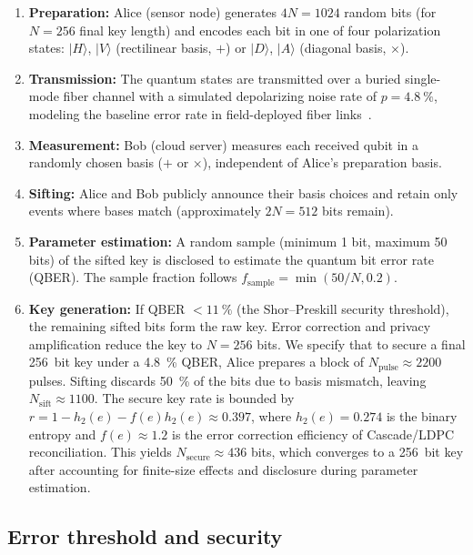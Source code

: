 \documentclass[11pt,a4paper]{article}
\begin{document}
\begin{enumerate}
\item \textbf{Preparation:} Alice (sensor node) generates $4N = 1024$ random bits (for $N = 256$ final key length) and encodes each bit in one of four polarization states: $|H\rangle$, $|V\rangle$ (rectilinear basis, $+$) or $|D\rangle$, $|A\rangle$ (diagonal basis, $\times$).
\item \textbf{Transmission:} The quantum states are transmitted over a buried single-mode fiber channel with a simulated depolarizing noise rate of $p = \qty{4.8}{\percent}$, modeling the baseline error rate in field-deployed fiber links~\cite{Zahidy2024}.
\item \textbf{Measurement:} Bob (cloud server) measures each received qubit in a randomly chosen basis ($+$ or $\times$), independent of Alice's preparation basis.
\item \textbf{Sifting:} Alice and Bob publicly announce their basis choices and retain only events where bases match (approximately $2N = 512$ bits remain).
\item \textbf{Parameter estimation:} A random sample (minimum 1 bit, maximum 50 bits) of the sifted key is disclosed to estimate the quantum bit error rate (QBER). The sample fraction follows $f_{\mathrm{sample}} = \min(50/N, 0.2)$.
\item \textbf{Key generation:} If QBER $< \qty{11}{\percent}$ (the Shor--Preskill security threshold), the remaining sifted bits form the raw key. Error correction and privacy amplification reduce the key to $N = \num{256}$ bits. We specify that to secure a final \qty{256}{bit} key under a \qty{4.8}{\percent} QBER, Alice prepares a block of $N_{\mathrm{pulse}} \approx \num{2200}$ pulses. Sifting discards \qty{50}{\percent} of the bits due to basis mismatch, leaving $N_{\mathrm{sift}} \approx \num{1100}$. The secure key rate is bounded by $r = 1 - h_2(e) - f(e)h_2(e) \approx \num{0.397}$, where $h_2(e) = \num{0.274}$ is the binary entropy and $f(e) \approx \num{1.2}$ is the error correction efficiency of Cascade/LDPC reconciliation. This yields $N_{\mathrm{secure}} \approx \num{436}$ bits, which converges to a \qty{256}{bit} key after accounting for finite-size effects and disclosure during parameter estimation.
\end{enumerate}

\subsection{Error threshold and security}
\end{document}
